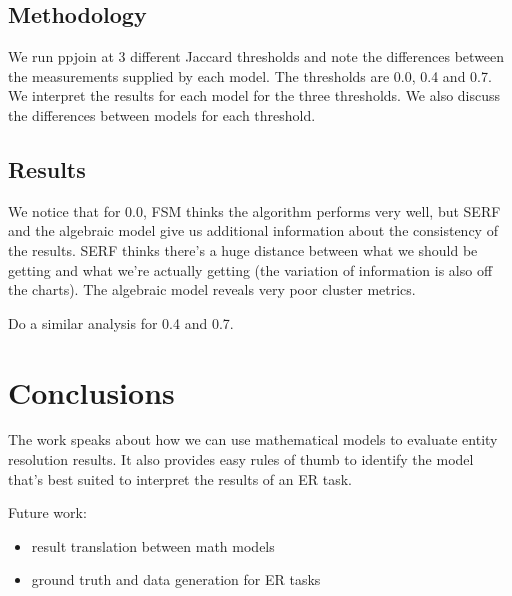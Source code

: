 \documentclass[11pt]{article}
\begin{document}
    \subsection[method]{Methodology}\label{subsec:methodology}

    We run ppjoin at 3 different Jaccard thresholds and note the differences between the measurements supplied by each model. The thresholds are 0.0, 0.4 and 0.7. We interpret the results for each model for the three thresholds. We also discuss the differences between models for each threshold.

    \subsection[results]{Results}\label{subsec:results}

    We notice that for 0.0, FSM thinks the algorithm performs very well, but SERF and the algebraic model give us additional information about the consistency of the results. 
    SERF thinks there's a huge distance between what we should be getting and what we're actually getting (the variation of information is also off the charts).
    The algebraic model reveals very poor cluster metrics.

    Do a similar analysis for 0.4 and 0.7.

    \section[conclusion]{Conclusions}\label{section:conclusions}

    The work speaks about how we can use mathematical models to evaluate entity resolution results. It also provides easy rules of thumb to identify the model that's best suited to interpret the results of an ER task.
    
    Future work:
    \begin{itemize}
        \item result translation between math models
        \item ground truth and data generation for ER tasks
    \end{itemize}

    
\end{document}
